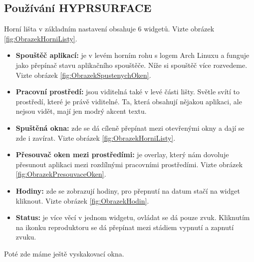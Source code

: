 \documentclass[12pt,a4paper]{article}
\begin{document}
\subsection{Používání HYPRSURFACE}
Horní lišta v základním nastavení obsahuje 6 widgetů. Vizte obrázek \ref{fig:ObrazekHorniListy}.

\begin{itemize}
  \item \textbf{Spouštěč aplikací:} je v levém horním rohu s logem Arch Linuxu a funguje jako přepínač stavu aplikačního spouštěče.
    Níže si spouštěč více rozvedeme. Vizte obrázek \ref{fig:ObrazekSpustenychOken}.

  \item \textbf{Pracovní prostředí:} jsou viditelná také v levé části lišty. Světle svítí to prostředí, které je právě viditelné. 
    Ta, která obsahují nějakou aplikaci, ale nejsou vidět, mají jen modrý akcent textu.

  \item \textbf{Spuštěná okna:} zde se dá cíleně přepínat mezi otevřenými okny a dají se zde i zavírat. Vizte obrázek \ref{fig:ObrazekHorniListy}.

  \item \textbf{Přesouvač oken mezi prostředími:} je overlay, který nám dovoluje přesunout aplikaci mezi rozdílnými pracovními
    prostředími. Vizte obrázek \ref{fig:ObrazekPresouvaceOken}.
    
  \item \textbf{Hodiny:} zde se zobrazují hodiny, pro přepnutí na datum stačí na widget kliknout. Vizte obrázek \ref{fig:ObrazekHodin}.

  \item \textbf{Status:} je více věcí v jednom widgetu, ovládat se dá pouze zvuk. Kliknutím na ikonku reproduktoru se dá přepínat mezi
    stádiem vypnutí a zapnutí zvuku.
\end{itemize}

Poté zde máme ještě vyskakovací okna.
\end{document}
